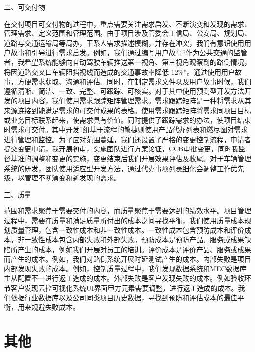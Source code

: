 \documentclass[UTF8]{../computerUniverse}
\begin{document}
二、可交付物

在交付项目可交付物的过程中，重点需要关注需求启发、不断演变和发现的需求、管理需求、定义范围和管理范围。由于项目涉及管委会工信局、公安局、规划局、道路与交通运输局等局办，干系人需求描述模糊，并存在冲突，我们有意识使用用户故事和引导进行需求启发。例如，我们通过编写用户故事“作为公共交通的监管者，我希望系统能够向自动驾驶车辆推送第一视角、第三视角观察到的路侧情况，将因道路交叉口车辆阻挡视线而造成的交通事故率降低 12\%”。通过使用用户故事，方便需求获取、沟通和评估。同时，在制定需求文件以及用户故事时候，我们遵循清晰、简洁、一致、完整、可跟踪、可核实。对于其中使用预测型开发方法开发的项目内容，我们使用需求跟踪矩阵管理需求。需求跟踪矩阵是一种将需求从其来源连接到能满足需求的可交付成果的表格。使用需求跟踪矩阵将需求同项目目标或业务目标联系起来，使需求具有价值。同时提供了跟踪需求的办法，使项目结束时需求可交付。其中开发1组基于流程的敏捷则使用产品代办列表和燃尽图对需求进行管理和监控。为了应对范围蔓延，我们还设置了严格的变更控制流程，申请者提交变更申请，我开展初审，实施团队进行方案论证，CCB审批变更，同时我监督基准的调整和变更的实施，变更结束后我们开展效果评估及收尾。对于车辆管理系统的研发，团队使用适应型开发方法，通过代办事项列表细化会调整工作优先级，以管理不断演变和新发现的需求。




三、质量

范围和需求聚焦于需要交付的内容，而质量聚焦于需要达到的绩效水平。项目管理过程中，需要在质量和满足质量所付出的成本之间寻找平衡，我们使用质量成本规划质量管理，包含一致性成本和非一致性成本。一致性成本包含预防成本和评价成本，非一致性成本包含内部失败和外部失败。预防成本是预防产品、服务或成果缺陷所产生的成本，例如我们开展对员工的培训。评价成本是评价产品、服务或成果而产生的成本。例如，我们对路侧系统开展时延测试产生的成本。内部失败是项目内部发现失败的成本。例如，控制质量过程中，我们发现数据系统和MEC数据库主从配置不一进行返工造成的成本。外部失败是客户发现失败的成本。例如验收环节客户发现云控可视化系统UI界面甲方元素需要调整，进行返工造成的成本。我们依据行业数据库以及公司同类项目历史数据，寻找到预防和评估成本的最佳平衡，用来规避失败成本。



\chapter{其他}
\begin{lstlisting}
 
\end{lstlisting}
\end{document}
